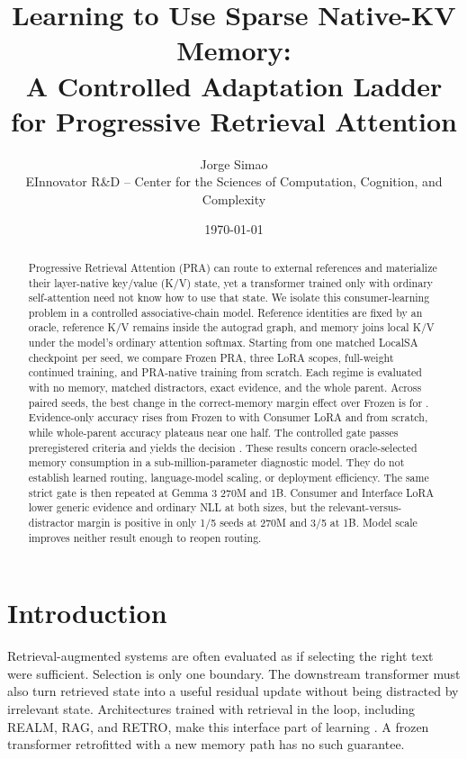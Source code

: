 \documentclass[11pt]{article}
\title{Learning to Use Sparse Native-KV Memory:\\A Controlled Adaptation Ladder for Progressive Retrieval Attention}
\author{Jorge Simao\\EInnovator R\&D -- Center for the Sciences of Computation, Cognition, and Complexity}
\date{\today}
\begin{document}
\maketitle

\begin{abstract}
Progressive Retrieval Attention (PRA) can route to external references and
materialize their layer-native key/value (K/V) state, yet a transformer trained
only with ordinary self-attention need not know how to use that state. We isolate
this consumer-learning problem in a controlled associative-chain model. Reference
identities are fixed by an oracle, reference K/V remains inside the autograd graph,
and memory joins local K/V under the model's ordinary attention softmax. Starting
from one matched LocalSA checkpoint per seed, we compare Frozen PRA, three LoRA
scopes, full-weight continued training, and PRA-native training from scratch. Each
regime is evaluated with no memory, matched distractors, exact evidence, and the
whole parent. Across \PaperFourSeedCount{} paired seeds, the best change in the
correct-memory margin effect over Frozen is \PaperFourBestMarginEffect{} for
\PaperFourBestMarginRegime{}. Evidence-only accuracy rises from
\PaperFourFrozenEvidenceAccuracy{} Frozen to \PaperFourConsumerEvidenceAccuracy{}
with Consumer LoRA and \PaperFourNativeEvidenceAccuracy{} from scratch, while
whole-parent accuracy plateaus near one half. The controlled gate passes
\PaperFourCriteriaPassed{} preregistered criteria and yields the decision
\texttt{\PaperFourGateDecision}. These results concern oracle-selected memory
consumption in a sub-million-parameter diagnostic model. They do not establish
learned routing, language-model scaling, or deployment efficiency.
The same strict gate is then repeated at Gemma 3 270M and 1B. Consumer and
Interface LoRA lower generic evidence and ordinary NLL at both sizes, but the
relevant-versus-distractor margin is positive in only 1/5 seeds at 270M and 3/5
at 1B. Model scale improves neither result enough to reopen routing.
\end{abstract}

\section{Introduction}

Retrieval-augmented systems are often evaluated as if selecting the right text
were sufficient. Selection is only one boundary. The downstream transformer must
also turn retrieved state into a useful residual update without being distracted
by irrelevant state. Architectures trained with retrieval in the loop, including
REALM, RAG, and RETRO, make this interface part of learning
\cite{guu2020realm,lewis2020rag,borgeaud2022retro}. A frozen transformer retrofitted
with a new memory path has no such guarantee.
\end{document}

